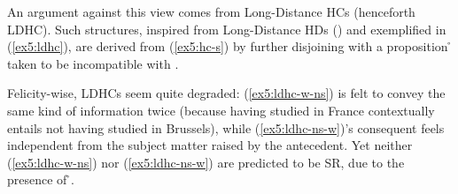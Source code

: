 An argument against this view comes from Long-Distance HCs (henceforth LDHC). Such structures, inspired from Long-Distance HDs (\cite{Marty2022}) and exemplified in (\ref{ex5:ldhc}), are derived from (\ref{ex5:hc-s}) by further disjoining \pplus{} with a proposition \r{} taken to be incompatible with \p. 


\begin{exe}
	\ex\label{ex5:ldhc-surface}
	\begin{xlist}
		\label{ex5:ldhc-w-ns}
		\label{ex5:ldhc-ns-w}
	\end{xlist}
\end{exe}

Felicity-wise, LDHCs seem quite degraded: (\ref{ex5:ldhc-w-ns}) is felt to convey the same kind of information twice (because having studied in France contextually entails not having studied in Brussels), while (\ref{ex5:ldhc-ns-w})'s consequent feels independent from the subject matter raised by the antecedent. Yet neither (\ref{ex5:ldhc-w-ns}) nor (\ref{ex5:ldhc-ns-w}) are predicted to be SR, due to the presence of \r{}.

